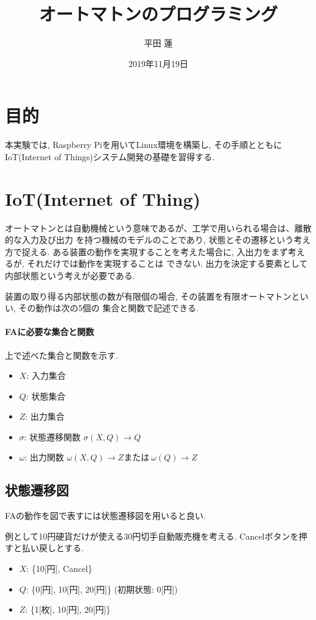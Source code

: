 \documentclass[titlepage]{jsarticle}
\title{オートマトンのプログラミング}
\author{平田 蓮}
\date{2019年11月19日}
\begin{document}
\maketitle
\section{目的}
    本実験では, Raspberry Piを用いてLinux環境を構築し, その手順とともにIoT(Internet of Things)システム開発の基礎を習得する.

\section{IoT(Internet of Thing)}
    オートマトンとは自動機械という意味であるが、工学で用いられる場合は、離散的な入力及び出力
    を持つ機械のモデルのことであり, 状態とその遷移という考え方で捉える.
    ある装置の動作を実現することを考えた場合に, 入出力をまず考えるが, それだけでは動作を実現することは
    できない. 出力を決定する要素として内部状態という考えが必要である.

    装置の取り得る内部状態の数が有限個の場合, その装置を有限オートマトンといい, その動作は次の5個の
    集合と関数で記述できる.

    \paragraph{FAに必要な集合と関数}
        上で述べた集合と関数を示す.

        \begin{itemize}
            \item $X$: 入力集合
            \item $Q$: 状態集合
            \item $Z$: 出力集合
            \item $\sigma$: 状態遷移関数 $\sigma(X, Q) \rightarrow Q$
            \item $\omega$: 出力関数 $\omega(X, Q) \rightarrow Z または \ \omega(Q) \rightarrow Z$
        \end{itemize}

    \subsection{状態遷移図}
        FAの動作を図で表すには状態遷移図を用いると良い.

        例として10円硬貨だけが使える30円切手自動販売機を考える.
        Cancelボタンを押すと払い戻しとする.

        \begin{itemize}
            \item $X$: \{10[円], Cancel\}
            \item $Q$: \{0[円], 10[円], 20[円]\} (初期状態: 0[円])
            \item $Z$: \{1[枚], 10[円], 20[円]\}
        \end{itemize}
\end{document}
